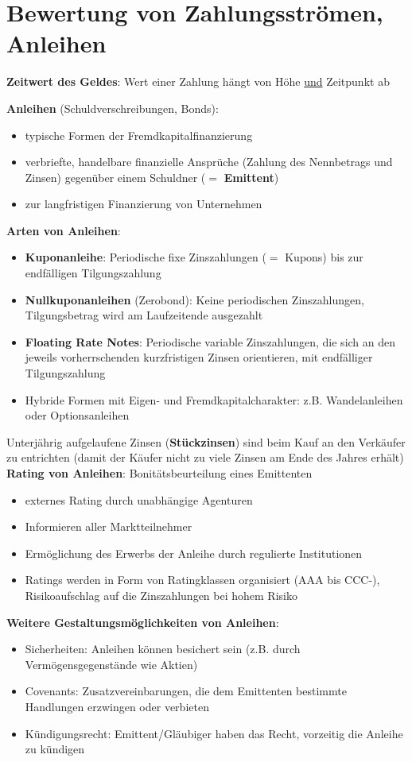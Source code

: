 \section{Bewertung von Zahlungsströmen, Anleihen}

\textbf{Zeitwert des Geldes}: Wert einer Zahlung hängt von Höhe \underline{und} Zeitpunkt ab

\textbf{Anleihen} (Schuldverschreibungen, Bonds):
\begin{itemize}
	\item typische Formen der Fremdkapitalfinanzierung
	\item verbriefte, handelbare finanzielle Ansprüche (Zahlung des Nennbetrags und Zinsen) gegenüber einem Schuldner ($=$ \textbf{Emittent})
	\item zur langfristigen Finanzierung von Unternehmen
\end{itemize}
\bigskip
\textbf{Arten von Anleihen}:
\begin{itemize}
	\item \textbf{Kuponanleihe}: Periodische fixe Zinszahlungen ($=$ Kupons) bis zur endfälligen Tilgungszahlung
	\item \textbf{Nullkuponanleihen} (Zerobond): Keine periodischen Zinszahlungen, Tilgungsbetrag wird am Laufzeitende ausgezahlt
	\item \textbf{Floating Rate Notes}: Periodische variable Zinszahlungen, die sich an den jeweils vorherrschenden kurzfristigen Zinsen orientieren, mit endfälliger Tilgungszahlung
	\item Hybride Formen mit Eigen- und Fremdkapitalcharakter: z.B. Wandelanleihen oder Optionsanleihen
\end{itemize}
Unterjährig aufgelaufene Zinsen (\textbf{Stückzinsen}) sind beim Kauf an den Verkäufer zu entrichten (damit der Käufer nicht zu viele Zinsen am Ende des Jahres erhält)\\

\textbf{Rating von Anleihen}: Bonitätsbeurteilung eines Emittenten
\begin{itemize}
	\item externes Rating durch unabhängige Agenturen
	\item Informieren aller Marktteilnehmer
	\item Ermöglichung des Erwerbs der Anleihe durch regulierte Institutionen
	\item Ratings werden in Form von Ratingklassen organisiert (AAA bis CCC-), Risikoaufschlag auf die
	Zinszahlungen bei hohem Risiko
\end{itemize}
\bigskip
\textbf{Weitere Gestaltungsmöglichkeiten von Anleihen}:
\begin{itemize}
	\item Sicherheiten: Anleihen können besichert sein (z.B. durch Vermögensgegenstände wie Aktien)
	\item Covenants: Zusatzvereinbarungen, die dem Emittenten bestimmte Handlungen erzwingen oder verbieten
	\item Kündigungsrecht: Emittent/Gläubiger haben das Recht, vorzeitig die Anleihe zu kündigen
\end{itemize}


